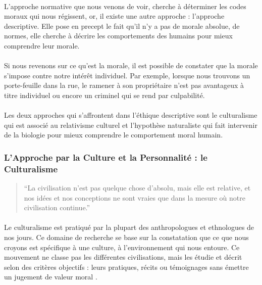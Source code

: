 \documentclass[10pt, french, a4paper]{report}
\begin{document}
\paragraph{}
L'approche normative que nous venons de voir, cherche à déterminer les codes moraux qui nous régissent, or, il existe une autre approche : l'approche descriptive. Elle pose en precept le fait qu'il n'y a pas de morale absolue, de normes, elle cherche à décrire les comportements des humains pour mieux comprendre leur morale.

\paragraph{}
Si nous revenons sur ce qu'est la morale, il est possible de constater que la morale s'impose contre notre intérêt individuel. Par exemple, lorsque nous trouvons un porte-feuille dans la rue, le ramener à son propriétaire n'est pas avantageux à titre individuel ou encore un criminel qui se rend par culpabilité.

\paragraph{}
Les deux approches qui s'affrontent dans l'éthique descriptive sont le culturalisme qui est associé au relativisme culturel et l'hypothèse naturaliste qui fait intervenir de la biologie pour mieux comprendre le comportement moral humain.

\subsubsection{L'Approche par la Culture et la Personnalité : le Culturalisme}

\begin{quotation}
  ``La civilisation n'est pas quelque chose d'absolu, mais elle est relative, et nos idées et nos conceptions ne sont vraies que dans la mesure où notre  civilisation continue.''
  \end{quotation}

\paragraph{}
Le culturalisme est pratiqué par la plupart des anthropologues et ethnologues de nos jours. Ce domaine de recherche se base sur la constatation que ce que nous croyons est spécifique à une culture, à l'environnement qui nous entoure. Ce mouvement ne classe pas les différentes civilisations, mais les étudie et décrit selon des critères objectifs : leurs pratiques, récits ou témoignages sans émettre un jugement de valeur moral \citep{servier_methode_1993}.
\end{document}
